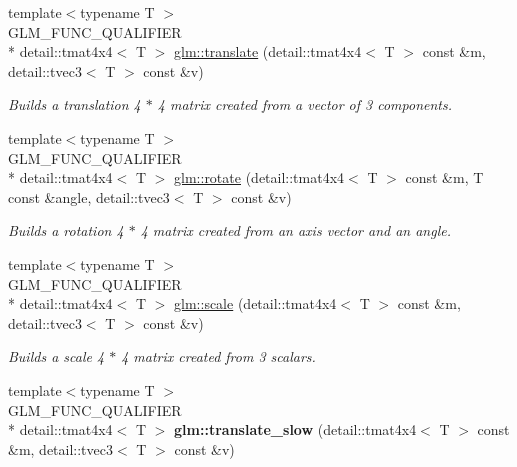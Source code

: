 \begin{DoxyCompactItemize}
\item 
{\footnotesize template$<$typename T $>$ }\\G\-L\-M\-\_\-\-F\-U\-N\-C\-\_\-\-Q\-U\-A\-L\-I\-F\-I\-E\-R \\*
detail\-::tmat4x4$<$ T $>$ \hyperlink{group__gtc__matrix__transform_ga8925161ecc1767957900c5ca8b922dc4}{glm\-::translate} (detail\-::tmat4x4$<$ T $>$ const \&m, detail\-::tvec3$<$ T $>$ const \&v)
\begin{DoxyCompactList}\small\item\em Builds a translation 4 $\ast$ 4 matrix created from a vector of 3 components. \end{DoxyCompactList}\item 
{\footnotesize template$<$typename T $>$ }\\G\-L\-M\-\_\-\-F\-U\-N\-C\-\_\-\-Q\-U\-A\-L\-I\-F\-I\-E\-R \\*
detail\-::tmat4x4$<$ T $>$ \hyperlink{group__gtc__matrix__transform_gaacb9cbe8f93a8fef9dc3e25559df19c0}{glm\-::rotate} (detail\-::tmat4x4$<$ T $>$ const \&m, T const \&angle, detail\-::tvec3$<$ T $>$ const \&v)
\begin{DoxyCompactList}\small\item\em Builds a rotation 4 $\ast$ 4 matrix created from an axis vector and an angle. \end{DoxyCompactList}\item 
{\footnotesize template$<$typename T $>$ }\\G\-L\-M\-\_\-\-F\-U\-N\-C\-\_\-\-Q\-U\-A\-L\-I\-F\-I\-E\-R \\*
detail\-::tmat4x4$<$ T $>$ \hyperlink{group__gtc__matrix__transform_ga223e08009f1cab54651200b81e91981c}{glm\-::scale} (detail\-::tmat4x4$<$ T $>$ const \&m, detail\-::tvec3$<$ T $>$ const \&v)
\begin{DoxyCompactList}\small\item\em Builds a scale 4 $\ast$ 4 matrix created from 3 scalars. \end{DoxyCompactList}\item 
\hypertarget{namespaceglm_aa2b6b80e7eef76aee5212899971fb11b}{{\footnotesize template$<$typename T $>$ }\\G\-L\-M\-\_\-\-F\-U\-N\-C\-\_\-\-Q\-U\-A\-L\-I\-F\-I\-E\-R \\*
detail\-::tmat4x4$<$ T $>$ {\bfseries glm\-::translate\-\_\-slow} (detail\-::tmat4x4$<$ T $>$ const \&m, detail\-::tvec3$<$ T $>$ const \&v)}\label{namespaceglm_aa2b6b80e7eef76aee5212899971fb11b}


\end{DoxyCompactItemize}

